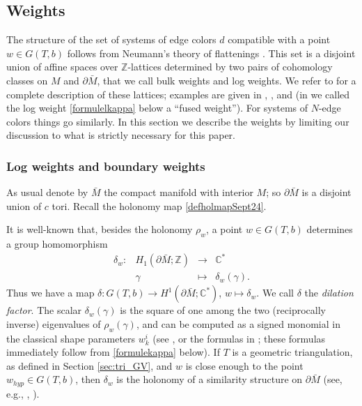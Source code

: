 \documentclass[11pt]{amsart}
\newcommand{\fonc}[5]{                     %
            \begin{array}{lcll}#1 :& #2 & \longrightarrow & #3 \\   %
                         &#4 &\longmapsto & #5          %
            \end{array}}
\newcommand{\mc}{\mathbb{C}}
\newcommand{\mz}{\mathbb{Z}}
\newcommand{\ra}{\rightarrow}
\begin{document}
\subsection{Weights}\label{LOGW} The structure of the set of systems of edge colors $d$ compatible with a point $w\in G(T,b)$ follows from Neumann's theory of flattenings \cite{N,N0}. This set is a disjoint union of affine spaces over $\mz$-lattices determined by two pairs of cohomology classes on $M$ and $\partial \bar M$, that we call bulk weights and log weights. We refer to \cite[Section 4C]{AGT} for a complete description of these lattices; examples are given in \cite[Section 6.4]{AGT0}, \cite[Section 9]{AGT}, and \cite[Section 9]{NA} (in \cite[Definition 1.7]{NA} we called the log weight \eqref{formulelkappa} below a ``fused weight''). For systems of $N$-edge colors things go similarly. In this section we describe the weights by limiting our discussion to what is strictly necessary for this paper.

\subsubsection{Log weights and boundary weights} \label{sec:landbweights} As usual denote by $\bar M$ the compact manifold with interior $M$; so $\partial \bar M$ is a disjoint union of $c$ tori. Recall the holonomy map \eqref{defholmapSept24}. 
\smallskip

It is well-known that, besides the holonomy $\rho_w$, a point $w\in G(T,b)$ determines a group homomorphism 
\begin{equation}\label{dilationdef}
\fonc{\delta_w}{H_1(\partial \bar M; \mz)}{\mc^*}{\gamma}{\delta_{w}(\gamma).}
\end{equation}
Thus we have a map $\delta\colon G(T,b)\ra H^1(\partial \bar M; \mc^*)$, $w\mapsto \delta_w$. We  call $\delta$ the {\it dilation factor}. The scalar $\delta_w(\gamma)$ is the square of one among the two (reciprocally inverse) eigenvalues of $\rho_w(\gamma)$, and can be computed as a signed monomial in the classical shape parameters $w^i_k$ (see \cite{NZ}, or the formulas in \cite[Lemma E.6.8]{BP}; these formulas immediately follow from \eqref{formulekappa} below). If $T$ is a geometric triangulation, as defined in Section \ref{sec:tri_GV}, and $w$ is close enough to the point $w_{hyp}\in G(T,b)$, then $\delta_w$ is the holonomy of a similarity structure on $\partial \bar M$ (see, e.g., \cite[Proposition E.6.5]{BP}, \cite[Proposition 2.3]{PP}).
\smallskip
\end{document}

